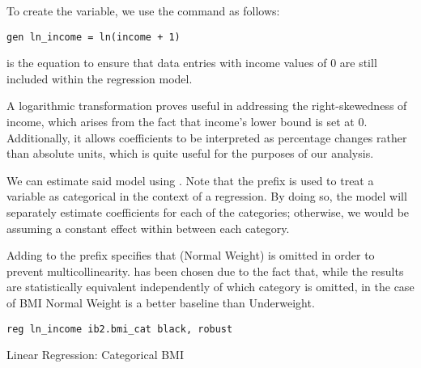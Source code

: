 

To create the  variable, we use the  command as follows:

\begin{verbatim}
gen ln_income = ln(income + 1)
\end{verbatim}

 is the equation to ensure that data entries with income values of 0 are still included
within the regression model.


A logarithmic transformation proves useful in addressing the right-skewedness of income, which arises from the fact that income's lower bound is set at 0. Additionally, it allows coefficients to be interpreted as percentage changes rather than absolute units, which is quite useful for the purposes of our analysis.


We can estimate said model using . Note that the  prefix is used to treat a variable as categorical in the context of a regression. By doing so, the model will separately estimate coefficients for each of the  categories; otherwise, we would be assuming a constant effect within between each category.

Adding  to the prefix specifies that  (Normal Weight) is omitted in order to prevent multicollinearity.  has been chosen due to the fact that, while the results are statistically equivalent independently of which category is omitted, in the case of BMI Normal Weight is a better baseline than Underweight.

\begin{verbatim}
reg ln_income ib2.bmi_cat black, robust
\end{verbatim}

\begin{table}[H]
    \begin{center}
        \caption{Linear Regression: Categorical BMI}
        
        \label{tab:reg4b}    
    \end{center}
\end{table}

